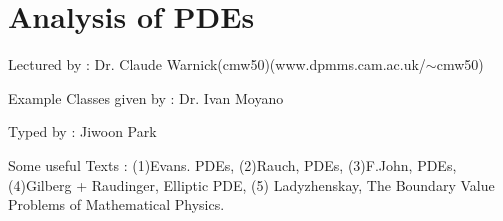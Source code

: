 \documentclass[12pt,a4paper]{report}
\DeclarePairedDelimiter\bignorm{\lVert}{\rVert}
\newcommand{\doublerule}[1][.4pt]{%
  \noindent
  \makebox[0pt][l]{\rule[.7ex]{\linewidth}{#1}}%
  \rule[.3ex]{\linewidth}{#1}}
\begin{document}


\newcommand{\thm}{\textbf{Theorem) }}
\newcommand{\thmnum}[1]{\textbf{Theorem #1) }}
\newcommand{\defi}{\textbf{Definition) }}
\newcommand{\definum}[1]{\textbf{Definition #1) }}
\newcommand{\lem}{\textbf{Lemma) }}
\newcommand{\lemnum}[1]{\textbf{Lemma #1) }}
\newcommand{\prop}{\textbf{Proposition) }}
\newcommand{\propnum}[1]{\textbf{Proposition #1) }}
\newcommand{\corr}{\textbf{Corollary) }}
\newcommand{\corrnum}[1]{\textbf{Corollary #1) }}
\newcommand{\pf}{\textbf{proof) }}

\newcommand{\lap}{\triangle} %
\newcommand{\s}{\vspace{10pt}}
\newcommand{\bull}{$\bullet$}
\newcommand{\sta}{$\star$}
\newcommand{\reals}{\mathbb{R}}

\newcommand{\eop}{\hfill  \textsl{(End of proof)} $\square$} %
\newcommand{\eos}{\hfill  \textsl{(End of statement)} $\square$} %


\newcommand{\intN}{\mathbb{Z}_N}
\newcommand{\nat}{\mathbb{N}}
\newcommand{\norms}[2]{\bignorm[\big]{#1}_{#2}}
\newcommand{\abs}[1]{\big| #1 \big|}
\newcommand{\avg}{\mathbb{E}}
\newcommand{\prob}{\mathbb{P}}
\newcommand{\borel}{\mathscr{B}}
\newcommand{\EE}{\mathscr{E}}
\newcommand{\pa}{\partial}
\newcommand{\loc}{L^1_{\text{loc}}}

\renewcommand{\vec}{\underline}
\renewcommand{\bar}{\overline}

\def\doubleunderline#1{\underline{\underline{#1}}}

\newcommand{\newday}{\doublerule[0.5pt]}
\newcommand{\digression}{**********************************************************************************************}


\setlength\parindent{0pt}

\chapter*{Analysis of PDEs}
\s

Lectured by : Dr. Claude Warnick(cmw50)(www.dpmms.cam.ac.uk/$\sim$cmw50)

Example Classes given by : Dr. Ivan Moyano
\s

Typed by : Jiwoon Park
\s

Some useful Texts : (1)Evans. PDEs, (2)Rauch, PDEs, (3)F.John, PDEs, (4)Gilberg + Raudinger, Elliptic PDE, (5) Ladyzhenskay, The Boundary Value Problems of Mathematical Physics.
\s
\end{document}
